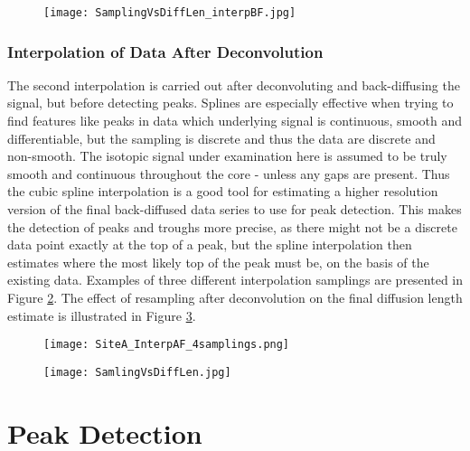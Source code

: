 \documentclass[../../CompleteThesis/Complete_1stDraft.tex]{subfiles}
\begin{document}
	
	\begin{figure}[h]
		\centering
		\texttt{[image: SamplingVsDiffLen\_interpBF.jpg]}
		\caption{}
		\label{Fig:COMPMETH_SamplingVsDiffLen_interpBF}
	\end{figure}
	
	
	
	\subsubsection[Interpolation 2]{Interpolation of Data After Deconvolution}
	\label{Subsubsec:CompMethod_StabilityTests_Interpolation2}
	The second interpolation is carried out after deconvoluting and back-diffusing the signal, but before detecting peaks. Splines are especially effective when trying to find features like peaks in data which underlying signal is continuous, smooth and differentiable, but the sampling is discrete and thus the data are discrete and non-smooth. The isotopic signal under examination here is assumed to be truly smooth and continuous throughout the core - unless any gaps are present. Thus the cubic spline interpolation is a good tool for estimating a higher resolution version of the final back-diffused data series to use for peak detection. This makes the detection of peaks and troughs more precise, as there might not be a discrete data point exactly at the top of a peak, but the spline interpolation then estimates where the most likely top of the peak must be, on the basis of the existing data. Examples of three different interpolation samplings are presented in Figure \ref{Fig:COMPMETH_SiteA_InterpAF_4samplings}. The effect of resampling after deconvolution on the final diffusion length estimate is illustrated in Figure \ref{Fig:COMPMETH_SamlingVsDiffLen}.
	
	\begin{figure}[h]
		\centering
		\texttt{[image: SiteA\_InterpAF\_4samplings.png]}
		\caption{}
		\label{Fig:COMPMETH_SiteA_InterpAF_4samplings}
	\end{figure}
	
	\begin{figure}[h]
		\centering
		\texttt{[image: SamlingVsDiffLen.jpg]}
		\caption{}
		\label{Fig:COMPMETH_SamlingVsDiffLen}
	\end{figure}
	
	\section[Peak Detection]{Peak Detection}
	\label{Sec:CompMeths_PeakDetection}
	
\end{document}

